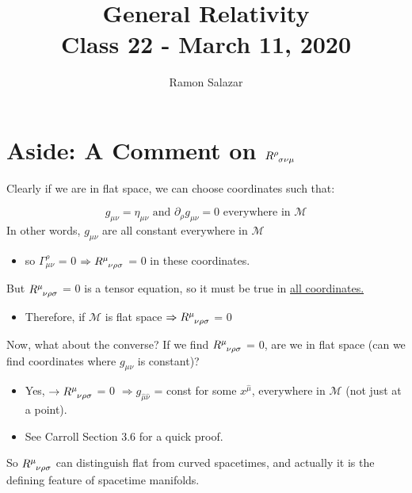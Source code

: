 \documentclass[10pt]{article}
\title{{\Huge General Relativity}\\{\Large{Class  22 - March 11, 2020}}} %
\author{Ramon Salazar}
\begin{document}
    \maketitle
    \flushbottom
    \newpage
    \pagestyle{fancynotes}
	
	\section{Aside: A Comment on $\tensor{R}{^\rho_\sigma _\nu _\mu}$}
	
	Clearly if we are in flat space, we can choose coordinates such that:

	$$g_{\mu\nu} = \eta_{\mu\nu} \text{ and } \partial_{\rho}g_{\mu\nu} = 0 \text{ everywhere in } \mathcal{M}$$
	In other words, $g_{\mu\nu}$ are all constant everywhere in $\mathcal{M}$

	\begin{itemize}[label=*]
	\item so $\Gamma^{\rho}_{\mu\nu}$ = 0 $\Rightarrow \tensor{R}{^\mu_\nu _\rho _\sigma}$ = 0 in these coordinates.
	\end{itemize}	
	But $\tensor{R}{^\mu_\nu _\rho _\sigma}$ = 0 is a tensor equation, so it must be true in \underline{all coordinates.}
	\begin{itemize}[label=*]
	\item Therefore, if $\mathcal{M}$ is flat space $\Rightarrow \tensor{R}{^\mu_\nu _\rho _\sigma}$ = 0
	\end{itemize}
	Now, what about the converse? If we find $\tensor{R}{^\mu_\nu _\rho _\sigma}$ = 0, are we in flat space (can we find
	coordinates where $g_{\mu\nu}$ is constant)?
	\begin{itemize}[label=*]
	\item Yes, $\rightarrow \tensor{R}{^\mu_\nu _\rho _\sigma}$ = 0 $\Rightarrow g_{\hat{\mu}\hat{\nu}}$ = const
	for some $x^{\hat{\mu}}$, everywhere in $\mathcal{M}$ (not just at a point).
	\item See Carroll Section 3.6 for a quick proof.
	\end{itemize}
	So $\tensor{R}{^\mu_\nu _\rho _\sigma}$ can distinguish flat from curved spacetimes, and actually it is the defining
	feature of spacetime manifolds.
\end{document}
